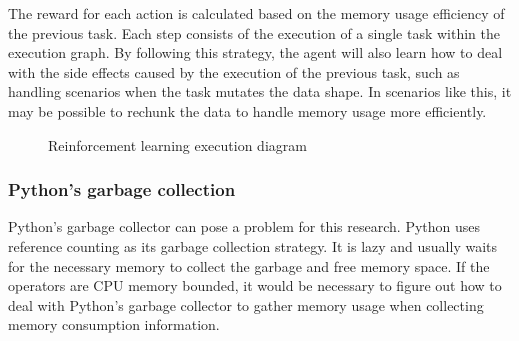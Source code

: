 The reward for each action is calculated based on the memory usage efficiency of the previous task.
Each step consists of the execution of a single task within the execution graph.
By following this strategy, the agent will also learn how to deal with the side effects caused by the execution of the previous task, such as handling scenarios when the task mutates the data shape.
In scenarios like this, it may be possible to rechunk the data to handle memory usage more efficiently.

\begin{figure}[ht]
  \caption{Reinforcement learning execution diagram}
  \label{fig:reinf-learning}
\end{figure}

\subsubsection{Python's garbage collection}

Python's garbage collector can pose a problem for this research.
Python uses reference counting as its garbage collection strategy. It is lazy and usually waits for the necessary memory to collect the garbage and free memory space.
If the operators are \ac{CPU} memory bounded, it would be necessary to figure out how to deal with Python's garbage collector to gather memory usage when collecting memory consumption information.